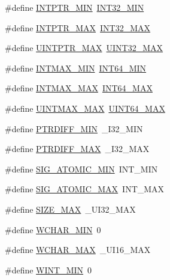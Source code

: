 \begin{DoxyCompactItemize}
\item 
\#define \hyperlink{a00119_a2aaa6d3aa1d7d1e0e326955aa24db752}{I\+N\+T\+P\+T\+R\+\_\+\+M\+IN}~\hyperlink{a00119_a688eb21a22db27c2b2bd5836943cdcbe}{I\+N\+T32\+\_\+\+M\+IN}
\item 
\#define \hyperlink{a00119_a9e5742f2bae4a5283431a3c03499e3a9}{I\+N\+T\+P\+T\+R\+\_\+\+M\+AX}~\hyperlink{a00119_a181807730d4a375f848ba139813ce04f}{I\+N\+T32\+\_\+\+M\+AX}
\item 
\#define \hyperlink{a00119_ab2355300ea19395357e62d780f4dd073}{U\+I\+N\+T\+P\+T\+R\+\_\+\+M\+AX}~\hyperlink{a00119_ab5eb23180f7cc12b7d6c04a8ec067fdd}{U\+I\+N\+T32\+\_\+\+M\+AX}
\item 
\#define \hyperlink{a00119_a2b0a3edfc672154f606dc3ad26277b61}{I\+N\+T\+M\+A\+X\+\_\+\+M\+IN}~\hyperlink{a00119_ab21f12f372f67b8ff0aa3432336ede67}{I\+N\+T64\+\_\+\+M\+IN}
\item 
\#define \hyperlink{a00119_a022b9b0a3564d786244a4631847c37a3}{I\+N\+T\+M\+A\+X\+\_\+\+M\+AX}~\hyperlink{a00119_ad0d744f05898e32d01f73f8af3cd2071}{I\+N\+T64\+\_\+\+M\+AX}
\item 
\#define \hyperlink{a00119_aa54fd5210434219e9027bfa0f0e325c8}{U\+I\+N\+T\+M\+A\+X\+\_\+\+M\+AX}~\hyperlink{a00119_a30654b4b67d97c42ca3f9b6052dda916}{U\+I\+N\+T64\+\_\+\+M\+AX}
\item 
\#define \hyperlink{a00119_ad9b88ba2fb858f98b50b38e49875d90e}{P\+T\+R\+D\+I\+F\+F\+\_\+\+M\+IN}~\+\_\+\+I32\+\_\+\+M\+IN
\item 
\#define \hyperlink{a00119_add2ef7bffac19cfdd1f4b5495409672f}{P\+T\+R\+D\+I\+F\+F\+\_\+\+M\+AX}~\+\_\+\+I32\+\_\+\+M\+AX
\item 
\#define \hyperlink{a00119_a21e605b9ac3a03b6de93cdf5a69e129f}{S\+I\+G\+\_\+\+A\+T\+O\+M\+I\+C\+\_\+\+M\+IN}~I\+N\+T\+\_\+\+M\+IN
\item 
\#define \hyperlink{a00119_a1f5fe9445d0ad0bee21bab1de4cc3e58}{S\+I\+G\+\_\+\+A\+T\+O\+M\+I\+C\+\_\+\+M\+AX}~I\+N\+T\+\_\+\+M\+AX
\item 
\#define \hyperlink{a00119_a3c75bb398badb69c7577b21486f9963f}{S\+I\+Z\+E\+\_\+\+M\+AX}~\+\_\+\+U\+I32\+\_\+\+M\+AX
\item 
\#define \hyperlink{a00119_a051084d5ebcabf282d9ca9bb2b891a78}{W\+C\+H\+A\+R\+\_\+\+M\+IN}~0
\item 
\#define \hyperlink{a00119_a2a823f3ccf2306cfbaa34d8addf66010}{W\+C\+H\+A\+R\+\_\+\+M\+AX}~\+\_\+\+U\+I16\+\_\+\+M\+AX
\item 
\#define \hyperlink{a00119_a5285bc55170ae1701e599decacc7f001}{W\+I\+N\+T\+\_\+\+M\+IN}~0

\end{DoxyCompactItemize}
